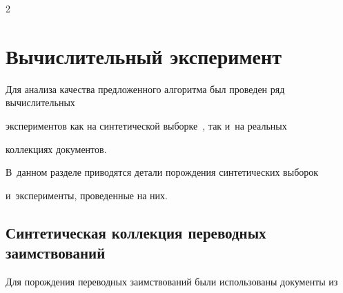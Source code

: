\begin{multicols}{2}




















\vspace*{-6pt}





\section{Вычислительный эксперимент}





Для анализа качества предложенного алгоритма был проведен ряд вычислительных 


экспериментов как на синтетической выборке~\cite{dataset}, так и~на реальных 


коллекциях документов.


В~данном разделе приводятся детали порождения синтетических выборок 


и~эксперименты, проведенные на них.





\vspace*{-6pt}





\subsection{Синтетическая коллекция переводных заимствований}





Для порождения переводных заимствований были использованы документы из 



\end{multicols}
